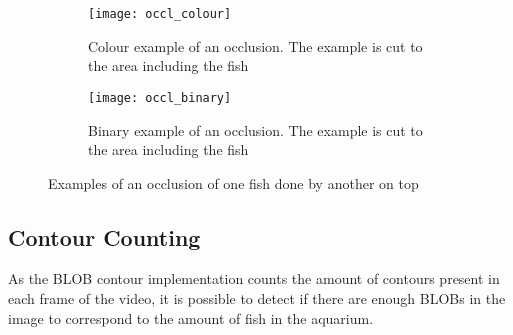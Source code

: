 \begin{figure}[H]
	\centering
	\begin{subfigure}{0.45\textwidth}
		\texttt{[image: occl\_colour]}
		\caption{Colour example of an occlusion. The example is cut to the area including the fish}
		\label{fig:occl_colour}
	\end{subfigure}
	\begin{subfigure}{0.45\textwidth}
		\texttt{[image: occl\_binary]}
		\caption{Binary example of an occlusion. The example is cut to the area including the fish}
		\label{fig:occl_binary}
	\end{subfigure}
\caption{Examples of an occlusion of one fish done by another on top}
\label{fig:occlusion_example}
\end{figure}

\subsection{Contour Counting}
As the BLOB contour implementation counts the amount of contours present in each frame of the video, it is possible to detect if there are enough BLOBs in the image to correspond to the amount of fish in the aquarium.